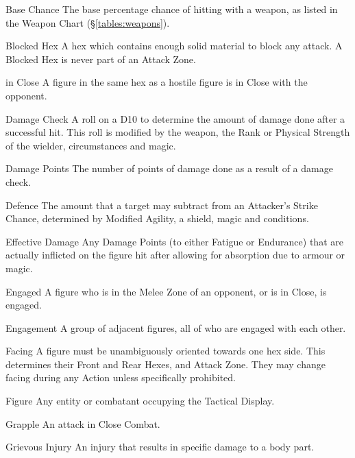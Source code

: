 \begin{multicols*}{3}
\begin{Description}
\item[Base Chance] The base percentage chance of hitting with a weapon, as
listed in the Weapon Chart (\S\ref{tables:weapons}).

\item[Blocked Hex] A hex which contains enough solid material to block any
attack. A Blocked Hex is never part of an Attack Zone.

\item[in Close] A figure in the same hex as a hostile figure is in Close
with the opponent.

\item[Damage Check] A roll on a D10 to determine the amount of damage
done after a successful hit. This roll is modified by the weapon, the
Rank or Physical Strength of the wielder, circumstances and magic.

\item[Damage Points] The number of points of damage done as a result of a
damage check.

\item[Defence] The amount that a target may subtract from an Attacker's
Strike Chance, determined by Modified Agility, a shield, magic and
conditions.

\item[Effective Damage] Any Damage Points (to either Fatigue or Endurance)
that are actually inflicted on the figure hit after allowing for
absorption due to armour or magic.

\item[Engaged] A figure who is in the Melee Zone of an opponent, or is in
Close, is engaged.

\item[Engagement] A group of adjacent figures, all of who are engaged with
each other.

\item[Facing] A figure must be unambiguously oriented towards one hex
side. This determines their Front and Rear Hexes, and Attack
Zone. They may change facing during any Action unless specifically
prohibited.

\item[Figure] Any entity or combatant occupying the Tactical Display.

\item[Grapple] An attack in Close Combat.

\item[Grievous Injury] An injury that results in specific damage to a body
part.


\end{Description}
\end{multicols*}

